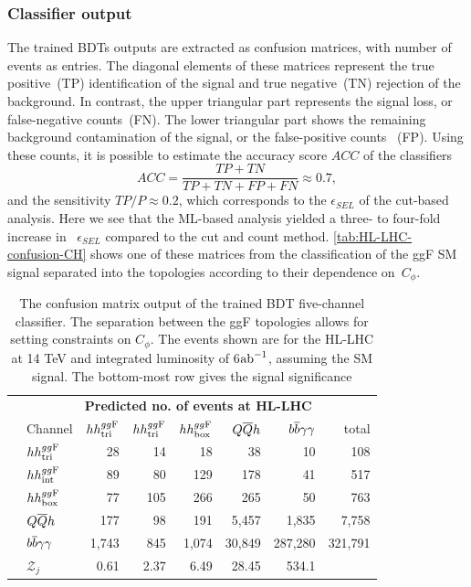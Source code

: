 \subsubsection*{Classifier output}
The trained BDTs outputs are extracted as confusion matrices,  with number of events as entries. The diagonal elements of these matrices represent the true positive~(TP) identification of the signal and true negative~(TN) rejection of the background. In contrast, the upper triangular part represents the signal loss, or false-negative counts~(FN). The lower triangular part shows the remaining background contamination of the signal, or the false-positive counts ~(FP). Using these counts, it is possible to estimate the accuracy score $ACC$ of the classifiers
\begin{equation}
	ACC = \frac{TP+TN}{TP+TN+FP+FN} \approx 0.7,
\end{equation}
and the sensitivity $ TP/P \approx 0.2$, which corresponds to the $\epsilon_{SEL}$ of the cut-based analysis. Here we see that the ML-based analysis yielded a three- to four-fold increase in~ $\epsilon_{SEL}$ compared to the cut and count method. \autoref{tab:HL-LHC-confusion-CH} shows one of these matrices from the classification of the ggF SM signal separated into the topologies according to their dependence on~$C_\phi$. 
\begin{table}[]
	\centering
	{\footnotesize
		\begin{tabular}{ll|rrrrr|r}
			\multirow{7}{*}{\rb{\bf \footnotesize Actual no. of events\hspace{0.45cm}}} & \multicolumn{7}{c}{\bf Predicted no. of events at HL-LHC}\\
			\cmidrule[\heavyrulewidth]{2-8}
			& Channel & $hh^{gg\rm F}_{\rm tri}$ & $hh^{gg\rm F}_{\rm tri}$ &  $hh^{gg\rm F}_{\rm box}$&      $Q\overline Q h$ & $b\overline b\gamma\gamma$ &   total \\
			\cline{2-8}
			&$hh^{gg\rm F}_{\rm tri}$         &   28 &	14 &	18&	38&	10&	108 \\
			&$hh^{gg\rm F}_{\rm int}$         &   	89&	80&	129&	178&	41&	517\\
			&$hh^{gg\rm F}_{\rm box}$         &   77&	105&	266&	265&	50&	763 \\
			&$Q\overline Q h$           &  177&	98&	191&	5,457&	1,835& 7,758 \\
			&$b\overline b\gamma\gamma$          & 1,743&	845&	1,074& 30,849&	287,280&	321,791 \\
				\cline{2-8}
				&$\mathcal{Z}_j$& 0.61&	2.37&	6.49&	28.45&	534.1	&       \\
			\cmidrule[\heavyrulewidth]{2-8}
		\end{tabular}
	} 
	\caption{The confusion matrix output of the trained BDT  five-channel classifier. The separation between the ggF topologies allows for setting constraints on $C_\phi$. The events shown are for the HL-LHC at 14 TeV and integrated luminosity of 6$\text{ab}^{-1}$, assuming the SM signal. The bottom-most row gives the signal significance}
	\label{tab:HL-LHC-confusion-CH}
\end{table}
